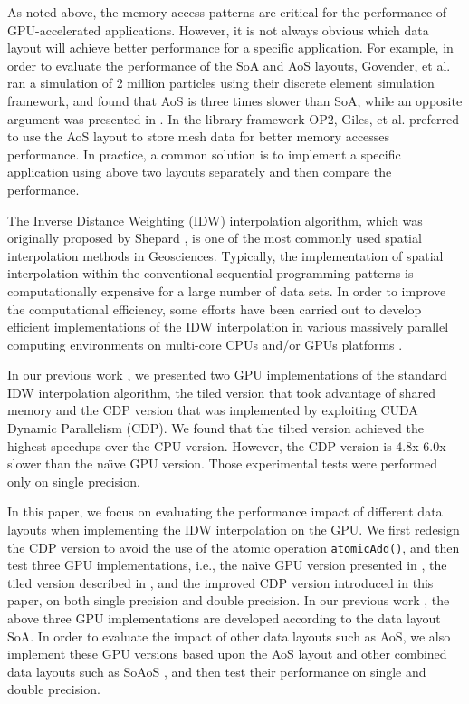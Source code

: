 As noted above, the memory access patterns are critical 
for the performance of GPU-accelerated applications. However, it is not 
always obvious which data layout will achieve better performance for a 
specific application. For example, in order to evaluate the performance of 
the SoA and AoS layouts, Govender, et al. \cite{govender2013}  ran a 
simulation of 2 million particles using their discrete element simulation 
framework, and found that AoS is three times slower than SoA, while an 
opposite argument was presented in \cite{giles2013}. In the library 
framework OP2, Giles, et al. \cite{giles2013} preferred to use the AoS 
layout to store mesh data for better memory accesses performance. In 
practice, a common solution is to implement a specific application using 
above two layouts separately and then compare the performance. 

The Inverse Distance Weighting (IDW) interpolation algorithm, which was 
originally proposed by Shepard \cite{shepard1968}, is one of the most commonly used 
spatial interpolation methods in Geosciences. Typically, the implementation 
of spatial interpolation within the conventional sequential programming 
patterns is computationally expensive for a large number of data sets. In 
order to improve the computational efficiency, some efforts have been 
carried out to develop efficient implementations of the IDW interpolation in 
various massively parallel computing environments on multi-core CPUs 
\cite{armstrong1997,guan2010,huang2011} and/or GPUs platforms \cite{hanzer2012,hennebohl2011,huraj2010,xia2011}.

In our previous work \cite{mei2014}, we presented two GPU implementations of the 
standard IDW interpolation algorithm, the tiled version that took advantage of shared 
memory and the CDP version that was implemented by exploiting CUDA Dynamic 
Parallelism (CDP). We found that the tilted version achieved the highest speedups 
over the CPU version. However, the CDP version is 4.8x  6.0x slower 
than the na\"{\i}ve GPU version. Those experimental tests were 
performed only on single precision.

In this paper, we focus on evaluating the performance impact of different 
data layouts when implementing the IDW interpolation on the GPU. We first 
redesign the CDP version to avoid the use of the atomic operation 
\texttt{atomicAdd()}, and then test three GPU implementations, i.e., the na\"{\i}ve 
GPU version presented in \cite{huraj2010}, the tiled version described in \cite{mei2014}, and 
the improved CDP version introduced in this paper, on both single precision 
and double precision. In our previous work \cite{mei2014}, the above three GPU 
implementations are developed according to the data layout SoA. In order to 
evaluate the impact of other data layouts such as AoS, we also implement 
these GPU versions based upon the AoS layout and other combined data layouts 
such as SoAoS \cite{siegel2009}, and then test their performance on single and double 
precision.

